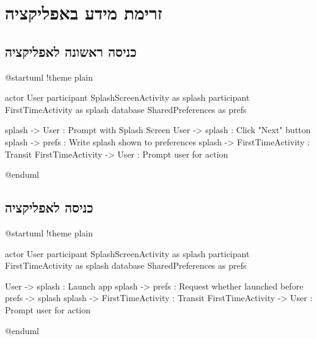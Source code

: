 \newenvironment{FigurePlantUML}{
\begin{otherlanguage}{english}
\begin{center}
}{
\end{center}
\end{otherlanguage}
}

\section{זרימת מידע באפליקציה}

\subsection{כניסה ראשונה לאפליקציה}

\begin{FigurePlantUML}
\begin{plantuml}
@startuml
!theme plain

actor User
participant SplashScreenActivity as splash
participant FirstTimeActivity as splash
database SharedPreferences as prefs

splash -> User : Prompt with Splash Screen
User -> splash : Click "Next" button
splash -> prefs : Write splash shown to preferences
splash -> FirstTimeActivity : Transit
FirstTimeActivity -> User : Prompt user for action

@enduml
\end{plantuml}
\end{FigurePlantUML}


\subsection{כניסה לאפליקציה}
\begin{FigurePlantUML}
\begin{plantuml}
@startuml
!theme plain

actor User
participant SplashScreenActivity as splash
participant FirstTimeActivity as splash
database SharedPreferences as prefs

User -> splash              : Launch app
splash -> prefs             : Request whether launched before
prefs -> splash
splash -> FirstTimeActivity : Transit
FirstTimeActivity -> User : Prompt user for action

@enduml
\end{plantuml}
\end{FigurePlantUML}

